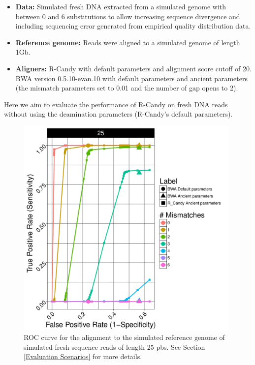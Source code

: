 \documentclass[11pt,a4paper]{report}
\begin{document}
  \begin{itemize}

   \item \textbf{Data:} Simulated fresh DNA extracted from a simulated genome 
   with between 0 and 6 substitutions to allow increasing sequence divergence
   and including sequencing error generated from empirical quality distribution data.
 
   
   \item \textbf{Reference genome:} Reads were aligned to a simulated genome of 
length 1Gb.

    \item \textbf{Aligners:} 
R-Candy with default parameters and alignment score cutoff of 20. \\
BWA version 0.5.10-evan.10 with default parameters and ancient parameters 
(the mismatch parameters set to
0.01 and the number of gap opens to 2)\cite{green2010draft}.

  \end{itemize}
 
Here we aim to evaluate the performance of R-Candy on fresh DNA reads 
without using the deamination parameters (R-Candy's default parameters).

\begin{figure}[H]
\centering
\includegraphics[width=11cm]{pictures/DS3_25_21_47_emp.pdf}
\caption{
ROC curve for the alignment to the simulated reference genome of simulated 
fresh sequence reads of length 25 pbs. See Section \ref{Evaluation Scenarios} 
for more details.}
\label{DS3_25}
\end{figure}
\end{document}
